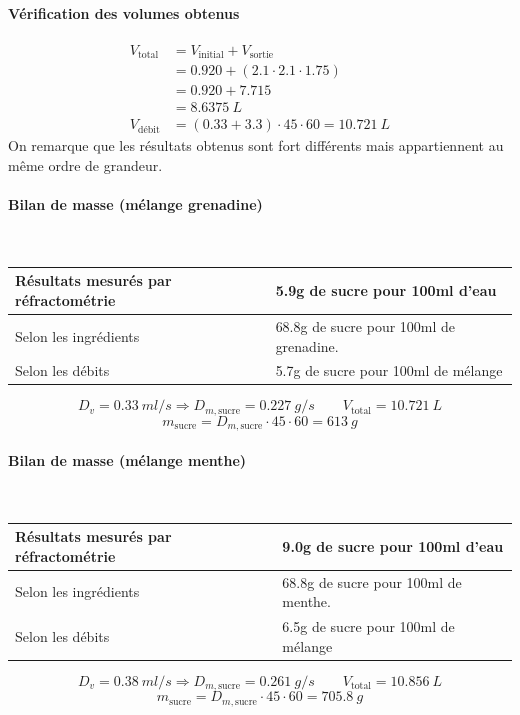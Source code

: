 \documentclass[a4paper,11pt, french]{article}
\begin{document}
	\paragraph*{Vérification des volumes obtenus}
		\begin{align*} 
			V_\text{total} &= V_\text{initial} + V_\text{sortie} \\
						   &= 0.920 + ( 2.1 \cdot 2.1 \cdot 1.75 ) \\
						   &= 0.920 + 7.715 \\
						   &= 8.6375\ L \\
			V_\text{débit} &= (0.33 + 3.3) \cdot 45 \cdot 60 = 10.721\ L 
		\end{align*}
		On remarque que les résultats obtenus sont fort différents mais appartiennent au même ordre de grandeur.
	\paragraph*{Bilan de masse (mélange grenadine)}\mbox{} \\
		\begin{table}[h]
			\centering
			\begin{tabular}{|l|l|}\hline
				Résultats mesurés par réfractométrie & 5.9g de sucre pour 100ml d'eau\\\hline
				Selon les ingrédients & 68.8g de sucre pour 100ml de grenadine.\\\hline
				Selon les débits & 5.7g de sucre pour 100ml de mélange\\\hline
			\end{tabular}
		\end{table}
		$$D_v = 0.33\ ml/s \Rightarrow D_{m,\text{sucre}} = 0.227\ g/s \qquad V_\text{total} = 10.721\ L$$
		$$m_\text{sucre} = D_{m,\text{sucre}} \cdot 45 \cdot 60 = 613\ g$$
	\paragraph*{Bilan de masse (mélange menthe)}\mbox{} \\
		\begin{table}[h]
			\centering
			\begin{tabular}{|l|l|}\hline
				Résultats mesurés par réfractométrie & 9.0g de sucre pour 100ml d'eau\\\hline
				Selon les ingrédients & 68.8g de sucre pour 100ml de menthe.\\\hline
				Selon les débits & 6.5g de sucre pour 100ml de mélange\\\hline
			\end{tabular}
		\end{table}
		$$D_v = 0.38\ ml/s \Rightarrow D_{m,\text{sucre}} = 0.261\ g/s \qquad V_\text{total} = 10.856\ L$$
		$$m_\text{sucre} = D_{m,\text{sucre}} \cdot 45 \cdot 60 = 705.8\ g$$
		
\end{document}
